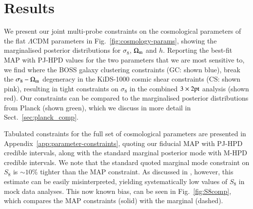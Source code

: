 \section{Results}
\label{sec:results}
We present our joint multi-probe constraints on the cosmological parameters of the flat $\Lambda$CDM parameters in Fig.~\ref{fig:cosmology-params}, showing the marginalised posterior distributions for $\sigma_8$, $\Omega_{\rm m}$ and $h$.   Reporting the best-fit MAP with PJ-HPD values for the two parameters that we are most sensitive to, we find
where the BOSS galaxy clustering constraints (GC: shown blue), break the $\sigma_8-\Omega_{\rm m}$ degeneracy in the KiDS-1000 cosmic shear constraints (CS: shown pink), resulting in tight constraints on $\sigma_8$ in the combined $3\times2{\rm pt}$ analysis (shown red).   Our constraints can be compared to the marginalised posterior distributions from Planck (shown green), which we discuss in more detail in Sect.~\ref{sec:planck_comp}.

Tabulated constraints for the full set of cosmological parameters are presented in Appendix~\ref{app:parameter-constraints}, quoting our fiducial MAP with PJ-HPD credible intervals, along with the standard marginal posterior mode with M-HPD credible intervals.   We note that the standard quoted marginal mode constraint on $S_8$ is $\sim 10\%$ tighter than the MAP constraint.  As discussed in \citet{joachimi/etal:inprep}, however, this estimate can be easily misinterpreted, yielding systematically low values of $S_8$ in mock data analyses.   This now known bias, can be seen in Fig.~\ref{fig:S8comp}, which compares the MAP constraints (solid) with the marginal (dashed).  

